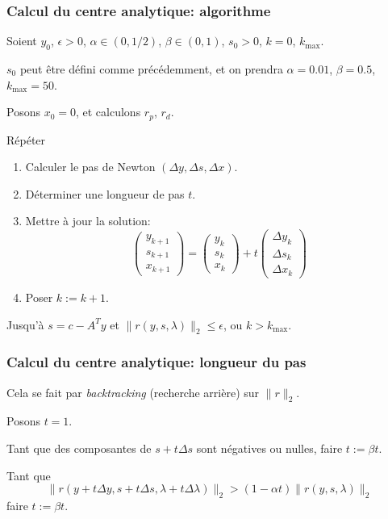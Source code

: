 \documentclass[usepdftitle=false, aspectratio=169]{beamer}
\begin{document}
\begin{frame}
	\frametitle{Calcul du centre analytique: algorithme}
	
	Soient $y_0$, $\epsilon > 0$, $\alpha \in (0, 1/2)$, $\beta \in (0,1)$, $s_0 > 0$, $k = 0$, $k_{\max}$.
	
	$s_0$ peut être défini comme précédemment, et on prendra $\alpha = 0.01$, $\beta = 0.5$, $k_{\max} = 50$.
	
	Posons $x_0 = 0$, et calculons $r_p$, $r_d$.
	
	Répéter
	\begin{enumerate}
		\item Calculer le pas de Newton $(\Delta y, \Delta s, \Delta x)$.
		\item Déterminer une longueur de pas $t$.
		\item Mettre à jour la solution:
		$$
		\begin{pmatrix}
			y_{k+1} \\ s_{k+1} \\ x_{k+1}
		\end{pmatrix}
		= 
		\begin{pmatrix}
			y_{k} \\ s_{k} \\ x_{k} 
		\end{pmatrix}
		+ t
		\begin{pmatrix}
			\Delta y_{k} \\ \Delta s_{k} \\ \Delta x_{k} 
		\end{pmatrix}
		$$
		\item Poser $k :=  k+1$.
	\end{enumerate}
	Jusqu'à $s = c - A^Ty$ et $\| r(y,s,\lambda)\|_2 \leq \epsilon$, ou $k > k_{\max}$.
	
\end{frame}

\begin{frame}
	\frametitle{Calcul du centre analytique: longueur du pas}
	
	Cela se fait par \textit{backtracking} (recherche arrière) sur $\| r \|_2$.
	
	\mbox{}
	
	Posons $t = 1$.
	
	\mbox{}
	
	Tant que des composantes de $s + t\Delta s$ sont négatives ou nulles, faire $t := \beta t$.
	
	\mbox{}
	
	Tant que
	$$
	\|r(y + t\Delta y, s + t\Delta s, \lambda + t\Delta \lambda) \|_2 > (1 - \alpha t) \| r(y,s,\lambda) \|_2
	$$
	faire $t := \beta t$.
	
\end{frame}
\end{document}
